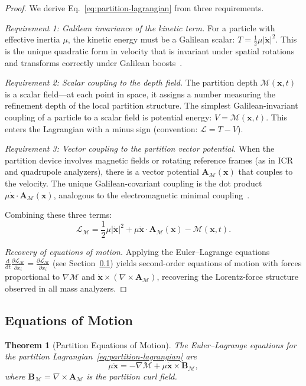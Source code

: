 \documentclass[11pt,twocolumn,a4paper]{article}
\newtheorem{theorem}{Theorem}[section]
\theoremstyle{definition}
\theoremstyle{remark}
\newcommand{\Depth}{\mathcal{M}}
\newcommand{\partinert}{\mu}
\newcommand{\Apartition}{\mathbf{A}_{\mathcal{M}}}
\newcommand{\Lagr}{\mathcal{L}}
\begin{document}
\begin{proof}
We derive Eq.~\eqref{eq:partition-lagrangian} from three requirements.

\emph{Requirement 1: Galilean invariance of the kinetic term.} For a particle with effective inertia $\partinert$, the kinetic energy must be a Galilean scalar: $T = \tfrac{1}{2}\partinert |\dot{\mathbf{x}}|^2$. This is the unique quadratic form in velocity that is invariant under spatial rotations and transforms correctly under Galilean boosts~\citep{arnold1989}.

\emph{Requirement 2: Scalar coupling to the depth field.} The partition depth $\Depth(\mathbf{x}, t)$ is a scalar field---at each point in space, it assigns a number measuring the refinement depth of the local partition structure. The simplest Galilean-invariant coupling of a particle to a scalar field is potential energy: $V = \Depth(\mathbf{x}, t)$. This enters the Lagrangian with a minus sign (convention: $\Lagr = T - V$).

\emph{Requirement 3: Vector coupling to the partition vector potential.} When the partition device involves magnetic fields or rotating reference frames (as in ICR and quadrupole analyzers), there is a vector potential $\Apartition(\mathbf{x})$ that couples to the velocity. The unique Galilean-covariant coupling is the dot product $\partinert \dot{\mathbf{x}} \cdot \Apartition(\mathbf{x})$, analogous to the electromagnetic minimal coupling~\citep{landau1977}.

Combining these three terms:
\[
  \Lagr_\Depth = \frac{1}{2}\partinert |\dot{\mathbf{x}}|^2 + \partinert \dot{\mathbf{x}} \cdot \Apartition(\mathbf{x}) - \Depth(\mathbf{x}, t).
\]

\emph{Recovery of equations of motion.} Applying the Euler--Lagrange equations $\frac{\mathrm{d}}{\mathrm{d}t}\frac{\partial \Lagr_\Depth}{\partial \dot{x}_i} = \frac{\partial \Lagr_\Depth}{\partial x_i}$ (see Section~\ref{sec:eom}) yields second-order equations of motion with forces proportional to $\nabla\Depth$ and $\dot{\mathbf{x}} \times (\nabla \times \Apartition)$, recovering the Lorentz-force structure observed in all mass analyzers.
\end{proof}

\subsection{Equations of Motion}
\label{sec:eom}

\begin{theorem}[Partition Equations of Motion]
\label{thm:partition-eom}
The Euler--Lagrange equations for the partition Lagrangian~\eqref{eq:partition-lagrangian} are
\begin{equation}
\label{eq:partition-eom}
  \partinert \ddot{\mathbf{x}} = -\nabla\Depth + \partinert \dot{\mathbf{x}} \times \mathbf{B}_\Depth,
\end{equation}
where $\mathbf{B}_\Depth = \nabla \times \Apartition$ is the partition curl field.
\end{theorem}
\end{document}
